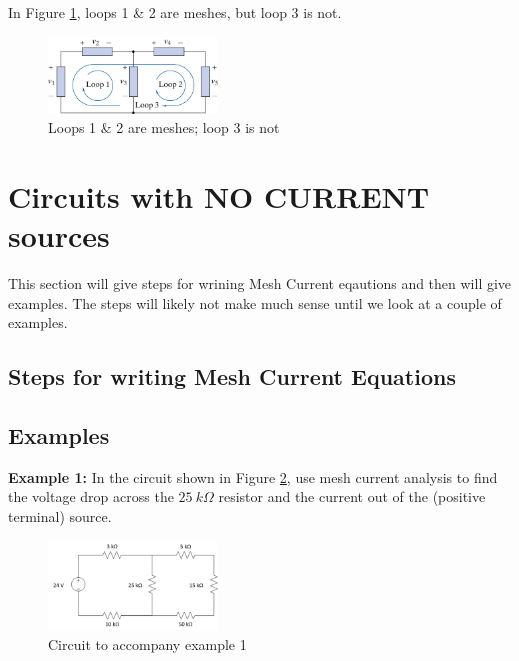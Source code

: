 \documentclass{handout}
\begin{document}
In Figure \ref{fig: SimpleLoopCounting}, loops 1 \& 2 are meshes, but loop 3 is not.

\begin{figure} [h t b]
\centering
\includegraphics[width=0.4\textwidth]{SimpleLoopCounting.jpg}
\caption{Loops 1 \& 2 are meshes; loop 3 is not}
\label{fig: SimpleLoopCounting}
\end{figure}

\newpage
\clearpage
\pagebreak

\section{Circuits with NO CURRENT sources}
This section will give steps for wrining Mesh Current eqautions and then will give examples.  The steps will likely not make much sense until we look at a couple of examples.

\subsection{Steps for writing Mesh Current Equations}

\subsection{Examples}
\textbf{Example 1:} In the circuit shown in Figure \ref{fig: MeshAnalysisEx1}, use mesh current analysis to find the voltage drop across the $25\ k\Omega$ resistor and the current out of the (positive terminal) source.  

\begin{figure} [h t b]
\centering
\includegraphics[width=0.4\textwidth]{MeshAnalysisEx1.jpg}
\caption{Circuit to accompany example 1}
\label{fig: MeshAnalysisEx1}
\end{figure}
\end{document}
